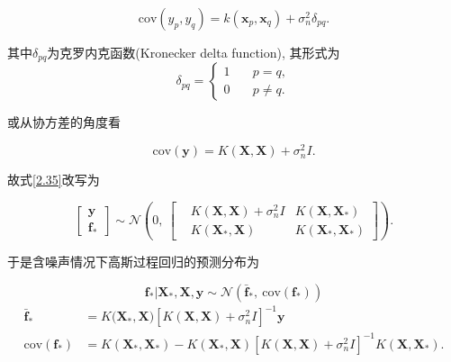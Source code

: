                 \begin{equation}
                    \mathrm{cov}(y_{p},y_{q})=k(\boldsymbol{x}_{p}, \boldsymbol{x}_{q})+\sigma^{2}_{n}\delta_{pq}.
                \end{equation}

                其中$\delta_{pq}$为克罗内克函数(Kronecker delta function), 其形式为
                \begin{equation}
                    \delta_{pq}=
                    \begin{cases} 
                        1 & \quad p=q,\\ 
                        0 & \quad p\neq q.
                    \end{cases}
                \end{equation}

                或从协方差的角度看

                \begin{equation}
                    \mathrm{cov}(\boldsymbol{y})=K(\boldsymbol{X}, \boldsymbol{X}) + \sigma^{2}_{n}I.
                \end{equation}
            
                故式\ref{2.35}改写为

                \begin{equation}\label{2.41}
                    \left[\begin{aligned}
                        \boldsymbol{y}\ \\
                        \boldsymbol{f}_{*}
                    \end{aligned}\right]
                    \sim\mathcal{N}\left(0,\
                    \begin{bmatrix}
                        &K(\boldsymbol{X}, \boldsymbol{X}) + \sigma^{2}_{n}I    &K(\boldsymbol{X}, \boldsymbol{X}_{*}) \\
                        &K(\boldsymbol{X}_{*}, \boldsymbol{X}) &K(\boldsymbol{X}_{*}, \boldsymbol{X}_{*})
                    \end{bmatrix}\right).
                \end{equation}

                于是含噪声情况下高斯过程回归的预测分布为

                \begin{equation}
                    \boldsymbol{f}_{*}|\boldsymbol{X}_{*},\boldsymbol{X},\boldsymbol{y}\sim\mathcal{N}(\boldsymbol{\bar{f}}_{*},\ \mathrm{cov}(\boldsymbol{f}_{*}))\label{2.42}
                \end{equation}
                \begin{align}
                    \boldsymbol{\bar{f}}_{*}&=K\bigl(\boldsymbol{X}_{*},\boldsymbol{X})[K(\boldsymbol{X},\boldsymbol{X})+\sigma^{2}_{n}I]^{-1}\boldsymbol{y} \label{2.43}\\
                    \mathrm{cov}(\boldsymbol{f}_{*})&=K(\boldsymbol{X}_{*},\boldsymbol{X}_{*})-K(\boldsymbol{X}_{*},\boldsymbol{X})[K(\boldsymbol{X},\boldsymbol{X})+\sigma^{2}_{n}I]^{-1}K(\boldsymbol{X},\boldsymbol{X}_{*}). \label{2.44}
                \end{align}

